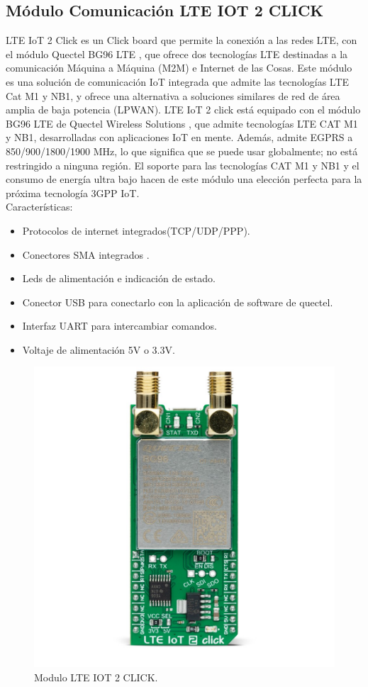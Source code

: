 \subsection{Módulo Comunicación LTE IOT 2 CLICK}
\label{subsec:ejemplo}
LTE IoT 2 Click es un Click board que permite la conexión a las redes LTE, con el módulo Quectel BG96 LTE , que ofrece dos tecnologías LTE destinadas a la comunicación Máquina a Máquina (M2M) e Internet de las Cosas. Este módulo es una solución de comunicación IoT integrada que admite las tecnologías LTE Cat M1 y NB1, y ofrece una alternativa a soluciones similares de red de área amplia de baja potencia (LPWAN).
LTE IoT 2 click está equipado con el módulo BG96 LTE de Quectel Wireless Solutions , que admite tecnologías LTE CAT M1 y NB1, desarrolladas con aplicaciones IoT en mente. Además, admite EGPRS a 850/900/1800/1900 MHz, lo que significa que se puede usar globalmente; no está restringido a ninguna región. El soporte para las tecnologías CAT M1 y NB1 y el consumo de energía ultra bajo hacen de este módulo una elección perfecta para la próxima tecnología 3GPP IoT.
\\Características:
\begin{itemize}
	\item Protocolos de internet integrados(TCP/UDP/PPP).
	\item Conectores SMA integrados .
	\item Leds de alimentación e indicación de estado.
	\item Conector USB para conectarlo con la aplicación de software de quectel.
	\item Interfaz UART para  intercambiar comandos. 
	\item Voltaje de alimentación 5V o 3.3V.

\end{itemize}


\begin{figure}[htbp]
	\centering
	\includegraphics[width=.4\textwidth]{./Figures/moduloBG96.jpg}
	\caption{Modulo LTE IOT 2 CLICK.}
	\label{fig:modulo LTE IOT}
\end{figure}

